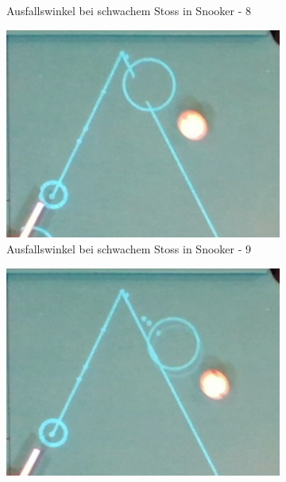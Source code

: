 \begin{figure}[h!]
\begin{subfigure}[b]{0.2\textwidth}
        \caption{Ausfallswinkel bei schwachem Stoss in Snooker - 8}
        \label{fig:rebound_angle_slow_snooker_8}
    \end{subfigure}
    \hfill
    \begin{subfigure}[b]{0.2\textwidth}
        \centering
        \includegraphics[width=1.0\linewidth]{../common/04_results/resources/simulation/rebound_angle_slow_snooker/00_rail_rebound_angle_slow_snooker_09.png}
        \caption{Ausfallswinkel bei schwachem Stoss in Snooker - 9}
        \label{fig:rebound_angle_slow_snooker_9}
    \end{subfigure}
    \hfill
    \begin{subfigure}[b]{0.2\textwidth}
        \centering
        \includegraphics[width=1.0\linewidth]{../common/04_results/resources/simulation/rebound_angle_slow_snooker/00_rail_rebound_angle_slow_snooker_10.png}

\end{subfigure}
\end{figure}
